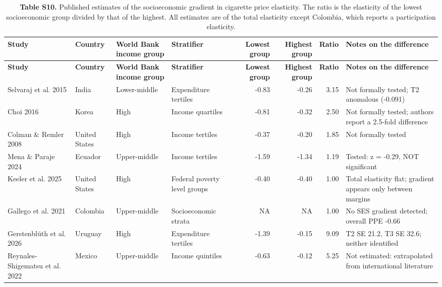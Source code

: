 \scriptsize
\setlength{\tabcolsep}{3pt}
\begin{longtable}{p{2.3cm}p{1.4cm}p{1.6cm}p{1.8cm}rrrp{3.1cm}}
\caption{\textbf{Table S10.} Published estimates of the socioeconomic gradient in cigarette price elasticity. The ratio is the elasticity of the lowest socioeconomic group divided by that of the highest. All estimates are of the total elasticity except Colombia, which reports a participation elasticity.}\\
\toprule
\textbf{Study} & \textbf{Country} & \textbf{World Bank income group} & \textbf{Stratifier} & \textbf{Lowest group} & \textbf{Highest group} & \textbf{Ratio} & \textbf{Notes on the difference} \\
\midrule
\endfirsthead
\toprule
\textbf{Study} & \textbf{Country} & \textbf{World Bank income group} & \textbf{Stratifier} & \textbf{Lowest group} & \textbf{Highest group} & \textbf{Ratio} & \textbf{Notes on the difference} \\
\midrule
\endhead
\bottomrule
\endfoot
Selvaraj et al. 2015 & India & Lower-middle & Expenditure tertiles & -0.83 & -0.26 & 3.15 & Not formally tested; T2 anomalous (-0.091) \\
Choi 2016 & Korea & High & Income quartiles & -0.81 & -0.32 & 2.50 & Not formally tested; authors report a 2.5-fold difference \\
Colman \& Remler 2008 & United States & High & Income tertiles & -0.37 & -0.20 & 1.85 & Not formally tested \\
Mena \& Paraje 2024 & Ecuador & Upper-middle & Income tertiles & -1.59 & -1.34 & 1.19 & Tested: z = -0.29, NOT significant \\
Keeler et al. 2025 & United States & High & Federal poverty level groups & -0.40 & -0.40 & 1.00 & Total elasticity flat; gradient appears only between margins \\
Gallego et al. 2021 & Colombia & Upper-middle & Socioeconomic strata &  NA &  NA & 1.00 & No SES gradient detected; overall PPE -0.66 \\
Gerstenblüth et al. 2026 & Uruguay & High & Expenditure tertiles & -1.39 & -0.15 & 9.09 & T2 SE 21.2, T3 SE 32.6; neither identified \\
Reynales-Shigematsu et al. 2022 & Mexico & Upper-middle & Income quintiles & -0.63 & -0.12 & 5.25 & Not estimated: extrapolated from international literature \\
\end{longtable}
\normalsize

